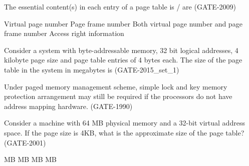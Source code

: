 \begin{questyle}

  \question  The essential content(s) in each entry of a page table is / are (GATE-2009)

  \begin{choices}
    \choice Virtual page number
    \choice Page frame number
    \choice Both virtual page number and page frame number
    \choice Access right information
  \end{choices}

\end{questyle}


\begin{questyle}

  \question  Consider a system with byte-addressable memory, 32 bit logical addresses, 4 kilobyte page size and page table entries of 4 bytes each. The size of the page table in the system in megabytes is \fillin[] (GATE-2015\_set\_1)

\end{questyle}


\begin{questyle}

  \question  Under paged memory management scheme, simple lock and key memory protection arrangement may still be required if the \fillin[] processors do not have address mapping hardware. (GATE-1990)

\end{questyle}


\begin{questyle}

  \question  Consider a machine with 64 MB physical memory and a 32-bit virtual address space. If the page size is 4KB, what
              is the approximate size of the page table?(GATE-2001)

  \begin{choices}
     MB
     MB
     MB
     MB
  \end{choices}

\end{questyle}


